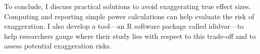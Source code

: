 To conclude, I discuss practical solutions to avoid exaggerating true effect sizes. Computing and reporting simple power calculations can help evaluate the risk of exaggeration. I also develop a tool—an R software package called ididvar—to help researchers gauge where their study lies with respect to this trade-off and to assess potential exaggeration risks.


